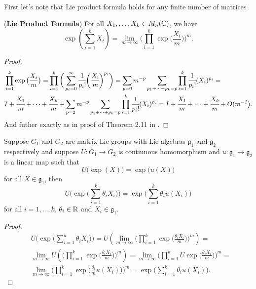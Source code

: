 \documentclass[main.tex]{subfiles}
\begin{document}
First let's note that Lie product formula holds for any finite number of matrices
\begin{theorem}(\textbf{Lie Product Formula})
For all $X_1, \dots, X_k\in M_n(\mathbb{C})$, we have
\begin{equation}
\exp(\sum_{i=1}^k X_i) = \lim_{m\to \infty} \bigg(\prod_{i=1}^k \exp\big(\frac{X_i}{m}\big)\bigg)^m.
\end{equation}
\end{theorem}
\begin{proof}
\begin{align*}
& \prod_{i=1}^k \exp\big(\frac{X_i}{m} \big) = \prod_{i=1}^k \bigg(\sum_{p_i=0}^\infty \cfrac{1}{p_i!}\bigg(\cfrac{X_i}{m}\bigg)^{p_i}\bigg) = \sum_{p=0} m^{-p}\sum_{p_1 + \cdots + p_k=p}\prod_{i=1}^k \cfrac{1}{p_i!} (X_i)^{p_i} = \\
& I + \cfrac{X_1}{m} + \cdots  + \cfrac{X_k}{m} + \sum_{p=2} m^{-p}\sum_{p_1 + \cdots + p_k=p}\prod_{i=1}^k \cfrac{1}{p_i!} (X_i)^{p_i} = I + \cfrac{X_1}{m} + \cdots  + \cfrac{X_k}{m} + O(m^{-2}).
\end{align*}
And futher exactly as in proof of Theorem 2.11 in \cite{hall2015}.
\end{proof}

\begin{lemma}
\label{lorentz-representation-theorem}
Suppose $G_1$ and $G_2$ are matrix Lie groups with Lie algebras $\mathfrak{g}_1$ and 
$\mathfrak{g}_2$ respectively and suppose $U:G_1\to G_2$ is contiunous homomorphism and $u: \mathfrak{g}_1\to \mathfrak{g}_2$ is a linear map such that
\begin{equation}
U\big(\exp(X)\big) = \exp\big(u(X)\big)
\end{equation}
for all $X\in \mathfrak{g}_1$, then
\begin{equation}
U\big(\exp\big(\sum_{i=1}^k \theta_i X_i\big)\big) = \exp\big(\sum_{i=1}^k \theta_i u(X_i)\big)
\end{equation}
for all $i=1, \dots, k$, $\theta_i\in \mathbb{R}$ and $X_i\in \mathfrak{g}_1$.
\end{lemma}
\begin{proof}
\begin{align*}
& U\big(\exp\big(\sum_{i=1}^k \theta_i X_i\big)\big) = 
U(\lim_{m\to \infty} \bigg(\prod_{i=1}^k \exp\big(\frac{\theta_i X_i}{m}\big) \bigg)^m) = \\
& \lim_{m\to \infty} U( \bigg(\prod_{i=1}^k \exp\big(\frac{\theta_i X_i}{m}\big) \bigg)^m) = \lim_{m\to \infty} \bigg(\prod_{i=1}^k U \exp\big(\frac{\theta_i X_i}{m}\big) \bigg)^m = \\
& \lim_{m\to \infty} \bigg(\prod_{i=1}^k \exp\big(\frac{\theta_i}{m} u(X_i) \big) \bigg)^m
= \exp\big(\sum_{i=1}^k \theta_i u(X_i)\big).
\end{align*}
\end{proof}
\end{document}
